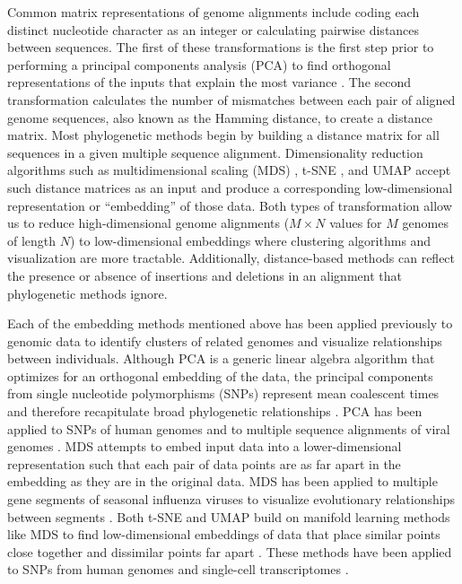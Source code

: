\documentclass[10pt,letterpaper]{article}
\begin{document}
Common matrix representations of genome alignments include coding each distinct nucleotide character as an integer or calculating pairwise distances between sequences.
The first of these transformations is the first step prior to performing a principal components analysis (PCA) to find orthogonal representations of the inputs that explain the most variance \cite{jolliffe_cadima_2016}.
The second transformation calculates the number of mismatches between each pair of aligned genome sequences, also known as the Hamming distance, to create a distance matrix.
Most phylogenetic methods begin by building a distance matrix for all sequences in a given multiple sequence alignment.
Dimensionality reduction algorithms such as multidimensional scaling (MDS) \cite{hout_papesh_goldinger_2012}, t-SNE \cite{maaten2008visualizing}, and UMAP \cite{lel2018umap} accept such distance matrices as an input and produce a corresponding low-dimensional representation or ``embedding'' of those data.
Both types of transformation allow us to reduce high-dimensional genome alignments ($M \times N$ values for $M$ genomes of length $N$) to low-dimensional embeddings where clustering algorithms and visualization are more tractable.
Additionally, distance-based methods can reflect the presence or absence of insertions and deletions in an alignment that phylogenetic methods ignore.

Each of the embedding methods mentioned above has been applied previously to genomic data to identify clusters of related genomes and visualize relationships between individuals.
Although PCA is a generic linear algebra algorithm that optimizes for an orthogonal embedding of the data, the principal components from single nucleotide polymorphisms (SNPs) represent mean coalescent times and therefore recapitulate broad phylogenetic relationships \cite{mcvean_2009}.
PCA has been applied to SNPs of human genomes \cite{novembre_2008,alexander_2009,mcvean_2009,auton_2015} and to multiple sequence alignments of viral genomes \cite{metsky_2017}.
MDS attempts to embed input data into a lower-dimensional representation such that each pair of data points are as far apart in the embedding as they are in the original data.
MDS has been applied to multiple gene segments of seasonal influenza viruses to visualize evolutionary relationships between segments \cite{rambaut_2008}.
Both t-SNE and UMAP build on manifold learning methods like MDS to find low-dimensional embeddings of data that place similar points close together and dissimilar points far apart \cite{kobak_2021}.
These methods have been applied to SNPs from human genomes \cite{diaz-papkovich_2019} and single-cell transcriptomes \cite{becht_2018,kobak_2019}.
\end{document}
